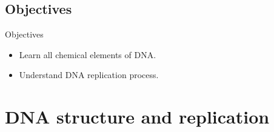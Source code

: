 \documentclass[10pt]{beamer}
\begin{document}
{%
\subsection{Objectives}

\begin{frame}{Objectives}{}
\begin{itemize}
    \item<1-> Learn all chemical elements of DNA. 
    \item<2-> Understand DNA replication process.
  \end{itemize}
\end{frame}

\section{DNA structure and replication}




}
\end{document}

